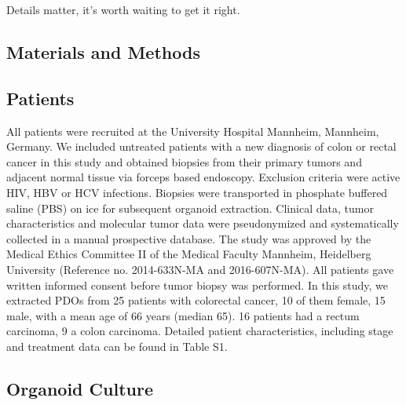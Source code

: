 \begin{savequote}[75mm]
Details matter, it’s worth waiting to get it right.
\end{savequote}

\begin{flushleft}
\chapter{Materials and Methods}

\section{Patients}
All patients were recruited at the University Hospital Mannheim, Mannheim, Germany. We included untreated patients with a new diagnosis of colon or rectal cancer in this study and obtained biopsies from their primary tumors and adjacent normal tissue via forceps based endoscopy. Exclusion criteria were active HIV, HBV or HCV infections. Biopsies were transported in phosphate buffered saline (PBS) on ice for subsequent organoid extraction. Clinical data, tumor characteristics and molecular tumor data were pseudonymized and systematically collected in a manual prospective database. The study was approved by the Medical Ethics Committee II of the Medical Faculty Mannheim, Heidelberg University (Reference no. 2014-633N-MA and 2016-607N-MA). All patients gave written informed consent before tumor biopsy was performed. In this study, we extracted PDOs from 25 patients with colorectal cancer, 10 of them female, 15 male, with a mean age of 66 years (median 65). 16 patients had a rectum carcinoma, 9 a colon carcinoma. Detailed patient characteristics, including stage and treatment data can be found in Table S1.

\section{Organoid Culture}


\end{flushleft}
